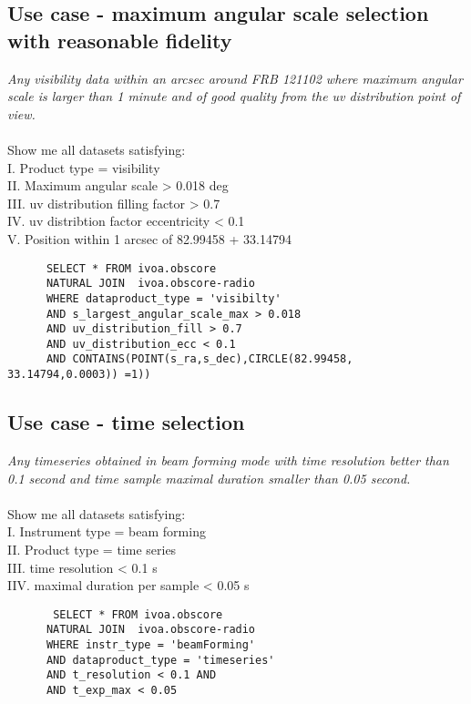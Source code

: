 \subsection{Use case - maximum angular scale selection with reasonable fidelity}
\textit{Any visibility data within an arcsec around FRB 121102 where  maximum angular scale is larger than 1 minute  and 
of good quality from the uv distribution point of view.}\\ \\
Show me all datasets satisfying:\\
I. Product type = visibility \\
II. Maximum angular scale  >  0.018 deg \\
III. uv distribution filling factor  > 0.7 \\
IV. uv distribtion factor eccentricity  < 0.1 \\
V. Position within 1 arcsec of 82.99458 + 33.14794
\begin{verbatim}
      SELECT * FROM ivoa.obscore 
      NATURAL JOIN  ivoa.obscore-radio
      WHERE dataproduct_type = 'visibilty' 
      AND s_largest_angular_scale_max > 0.018 
      AND uv_distribution_fill > 0.7 
      AND uv_distribution_ecc < 0.1  
      AND CONTAINS(POINT(s_ra,s_dec),CIRCLE(82.99458, 33.14794,0.0003)) =1))
\end{verbatim}

\subsection{Use case -  time selection }
\textit{Any timeseries obtained in beam forming mode with time resolution better than 0.1 second and time sample maximal duration smaller than 0.05 second. }\\ \\
Show me all datasets satisfying:\\
I. Instrument type = beam forming\\
II. Product type = time series  \\
III. time resolution < 0.1 s\\
IIV. maximal duration per sample  < 0.05 s \\

\begin{verbatim}
       SELECT * FROM ivoa.obscore 
      NATURAL JOIN  ivoa.obscore-radio
      WHERE instr_type = 'beamForming' 
      AND dataproduct_type = 'timeseries' 
      AND t_resolution < 0.1 AND
      AND t_exp_max < 0.05 
\end{verbatim}

